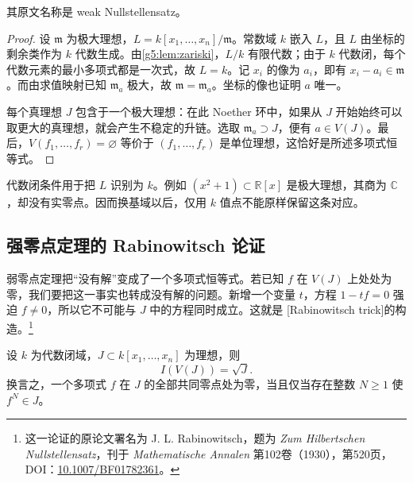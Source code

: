 其原文名称是 weak Nullstellensatz。
\begin{proof}
	设 \(\mathfrak m\) 为极大理想，\(L=k[x_1,\ldots,x_n]/\mathfrak m\)。常数域 \(k\) 嵌入 \(L\)，且 \(L\) 由坐标的剩余类作为 \(k\) 代数生成。由\cref{g5:lem:zariski}，\(L/k\) 有限代数；由于 \(k\) 代数闭，每个代数元素的最小多项式都是一次式，故 \(L=k\)。记 \(x_i\) 的像为 \(a_i\)，即有 \(x_i-a_i\in\mathfrak m\)。而由求值映射已知 \(\mathfrak m_a\) 极大，故 \(\mathfrak m=\mathfrak m_a\)。坐标的像也证明 \(a\) 唯一。

	每个真理想 \(J\) 包含于一个极大理想：在此 Noether 环中，如果从 \(J\) 开始始终可以取更大的真理想，就会产生不稳定的升链。选取 \(\mathfrak m_a\supset J\)，便有 \(a\in V(J)\)。最后，\(V(f_1,\ldots,f_r)=\varnothing\) 等价于 \((f_1,\ldots,f_r)\) 是单位理想，这恰好是所述多项式恒等式。
\end{proof}

代数闭条件用于把 \(L\) 识别为 \(k\)。例如 \((x^2+1)\subset\mathbb R[x]\) 是极大理想，其商为 \(\mathbb C\)，却没有实零点。因而换基域以后，仅用 \(k\) 值点不能原样保留这条对应。

\subsection{强零点定理的 Rabinowitsch 论证}
\label{g5:subsec:0101:04}

弱零点定理把“没有解”变成了一个多项式恒等式。若已知 \(f\) 在 \(V(J)\) 上处处为零，我们要把这一事实也转成没有解的问题。新增一个变量 \(t\)，方程 \(1-tf=0\) 强迫 \(f\ne0\)，所以它不可能与 \(J\) 中的方程同时成立。这就是 [Rabinowitsch trick]的构造。\footnote{这一论证的原论文署名为 J. L. Rabinowitsch，题为 \emph{Zum Hilbertschen Nullstellensatz}，刊于 \emph{Mathematische Annalen} 第102卷（1930），第520页，DOI：\href{https://doi.org/10.1007/BF01782361}{10.1007/BF01782361}。}

\begin{theorem}[强零点定理]\label{g5:thm:nullstellensatz}
	设 \(k\) 为代数闭域，\(J\subset k[x_1,\ldots,x_n]\) 为理想，则
	\[
		I(V(J))=\sqrt J.
	\]
	换言之，一个多项式 \(f\) 在 \(J\) 的全部共同零点处为零，当且仅当存在整数 \(N\geq1\) 使 \(f^N\in J\)。
\end{theorem}

